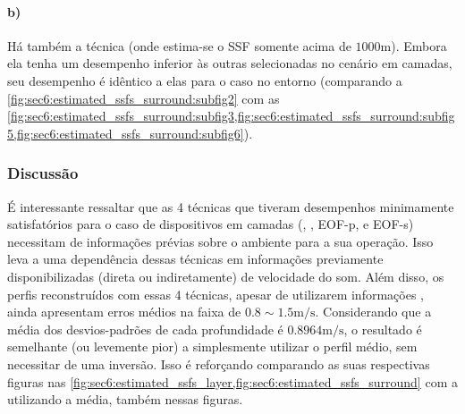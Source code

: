 \paragraph{b)} Há também a técnica  (onde estima-se o SSF somente acima de $1000\si{\meter}$). Embora ela tenha um desempenho inferior às outras selecionadas no cenário em camadas, seu desempenho é idêntico a elas para o caso no entorno (comparando a \cref{fig:sec6:estimated_ssfs_surround:subfig2} com as \cref{fig:sec6:estimated_ssfs_surround:subfig3,fig:sec6:estimated_ssfs_surround:subfig5,fig:sec6:estimated_ssfs_surround:subfig6}).

\subsubsection*{Discussão}

É interessante ressaltar que as 4 técnicas que tiveram desempenhos minimamente satisfatórios para o caso de dispositivos em camadas (, , EOF-p, e EOF-s) necessitam de informações prévias sobre o ambiente para a sua operação. Isso leva a uma dependência dessas técnicas em informações previamente disponibilizadas (direta ou indiretamente) de velocidade do som. Além disso, os perfis reconstruídos com essas 4 técnicas, apesar de utilizarem informações , ainda apresentam erros médios na faixa de ${0.8\sim1.5}\si{\meter/\second}$. Considerando que a média dos desvios-padrões de cada profundidade é $0.8964\si{\meter/\second}$, o resultado é semelhante (ou levemente pior) a simplesmente utilizar o perfil médio, sem necessitar de uma inversão. Isso é reforçando comparando as suas respectivas figuras nas \cref{fig:sec6:estimated_ssfs_layer,fig:sec6:estimated_ssfs_surround} com a utilizando a média, também nessas figuras.
%